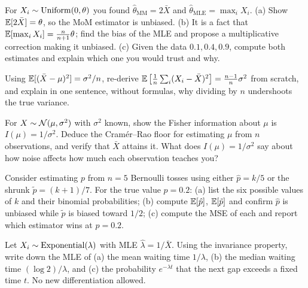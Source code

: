 \begin{exercise}
\label{ch30:exc-unif}
For $X_i\sim\operatorname{Uniform}(0,\theta)$ you found $\hat\theta_{\mathrm{MM}}=2\bar X$ and
$\hat\theta_{\mathrm{MLE}}=\max_i X_i$.
(a) Show $\operatorname{\mathbb{E}}[2\bar X]=\theta$, so the MoM estimator is unbiased.
(b) It is a fact that $\operatorname{\mathbb{E}}[\max_i X_i]=\frac{n}{n+1}\theta$; find the bias of the
MLE and propose a multiplicative correction making it unbiased.
(c) Given the data $0.1, 0.4, 0.9$, compute both estimates and explain which one
you would trust and why.
\end{exercise}

\begin{exercise}
\label{ch30:exc-n-minus-1}
Using $\operatorname{\mathbb{E}}[(\bar X-\mu)^2]=\sigma^2/n$, re-derive
$\operatorname{\mathbb{E}}\big[\frac1n\sum_i(X_i-\bar X)^2\big]=\frac{n-1}{n}\sigma^2$ from scratch, and
explain in one sentence, without formulas, why dividing by $n$ undershoots the
true variance.
\end{exercise}

\begin{exercise}
\label{ch30:exc-fisher-normal}
For $X\sim\mathcal{N}(\mu,\sigma^2)$ with $\sigma^2$ known, show the Fisher
information about $\mu$ is $I(\mu)=1/\sigma^2$. Deduce the Cram\'er--Rao floor for
estimating $\mu$ from $n$ observations, and verify that $\bar X$ attains it.
What does $I(\mu)=1/\sigma^2$ say about how noise affects how much each
observation teaches you?
\end{exercise}

\begin{exercise}
\label{ch30:exc-bv}
Consider estimating $p$ from $n=5$ Bernoulli tosses using either
$\hat p = k/5$ or the shrunk $\tilde p=(k+1)/7$. For the true value $p=0.2$:
(a) list the six possible values of $k$ and their binomial probabilities;
(b) compute $\operatorname{\mathbb{E}}[\hat p]$, $\operatorname{\mathbb{E}}[\tilde p]$ and confirm $\hat p$ is unbiased while
$\tilde p$ is biased toward $1/2$;
(c) compute the MSE of each and report which estimator wins at $p=0.2$.
\end{exercise}

\begin{exercise}[Invariance]
\label{ch30:exc-invariance}
Let $X_i\sim\operatorname{Exponential}(\lambda)$ with MLE $\hat\lambda=1/\bar X$. Using the invariance
property, write down the MLE of (a) the mean waiting time $1/\lambda$, (b) the
median waiting time $(\log 2)/\lambda$, and (c) the probability $e^{-\lambda t}$
that the next gap exceeds a fixed time $t$. No new differentiation allowed.
\end{exercise}

